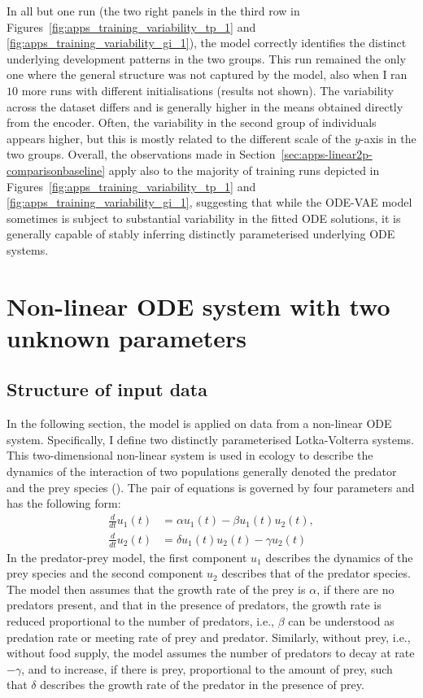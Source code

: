 In all but one run (the two right panels in the third row in Figures~\ref{fig:apps_training_variability_tp_1} and \ref{fig:apps_training_variability_gi_1}), the model correctly identifies the distinct underlying development patterns in the two groups. 
This run remained the only one where the general structure was not captured by the model, also when I ran $10$ more runs with different initialisations (results not shown). 
The variability across the dataset differs and is generally higher in the means obtained directly from the encoder. Often, the variability in the second group of individuals appears higher, but this is mostly related to the different scale of the $y$-axis in the two groups. Overall, the observations made in Section~\ref{sec:apps-linear2p-comparisonbaseline} apply also to the majority of training runs depicted in Figures~\ref{fig:apps_training_variability_tp_1} and \ref{fig:apps_training_variability_gi_1}, suggesting that while the ODE-VAE model sometimes is subject to substantial variability in the fitted ODE solutions, it is generally capable of stably inferring distinctly parameterised underlying ODE systems.

\section{Non-linear ODE system with two unknown parameters}\label{sec:apps-nonlinear2p}

\subsection{Structure of input data}\label{sec:apps-nonlinear-inputdata}
In the following section, the model is applied on data from a non-linear ODE system. Specifically, I define two distinctly parameterised Lotka-Volterra systems. This two-dimensional non-linear system is used in ecology to describe the dynamics of the interaction of two populations generally denoted the predator and the prey species (\cite[p.~209]{Teschl2012}). The pair of equations is governed by four parameters and has the following form: 
\begin{equation}\label{eq:general-lotka-volterra-system}
	\begin{split}
			\frac{d}{dt} u_1(t) &= \alpha u_1(t) - \beta u_1(t)u_2(t), \\
			\frac{d}{dt} u_2(t) &= \delta u_1(t)u_2(t) - \gamma u_2(t)
	\end{split}
\end{equation}
In the predator-prey model, the first component $u_1$ describes the dynamics of the prey species and the second component $u_2$ describes that of the predator species. The model then assumes that the growth rate of the prey is $\alpha$, if there are no predators present, and that in the presence of predators, the growth rate is reduced proportional to the number of predators, i.e., $\beta$ can be understood as predation rate or meeting rate of prey and predator. Similarly, without prey, i.e., without food supply, the model assumes the number of predators to decay at rate $-\gamma$, and to increase, if there is prey,  proportional to the amount of prey, such that $\delta$ describes the growth rate of the predator in the presence of prey. 

